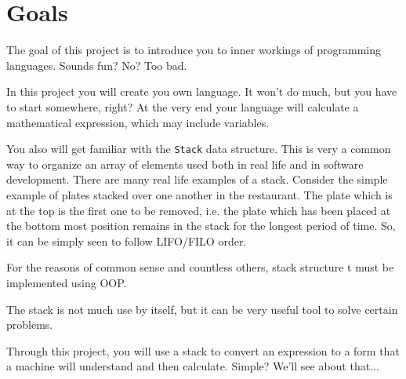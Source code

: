 \documentclass{42-en}
\begin{document}
\chapter{Goals}
    
    The goal of this project is to introduce you to inner workings of
    programming languages. Sounds fun? No? Too bad.
    
    In this project you will create you own language. It won't do much, but you
    have to start somewhere, right? At the very end your language will calculate
    a mathematical expression, which may include variables.
    
    You also will get familiar with the \texttt{Stack} data structure. 
    This is very a common way to organize an array of elements
    used both in real life and in software development. There are many real life
    examples of a stack. Consider the simple example of plates stacked over one 
    another in the restaurant. The plate which is at the top is the first one to be 
    removed, i.e. the plate which has been placed at the bottom most position 
    remains in the stack for the longest period of time. 
    So, it can be simply seen to follow LIFO/FILO order.
    
    
    For the reasons of common sense and countless others, stack structure t
    must be implemented using OOP.
    

    The stack is not much use by itself, but it can be very useful tool to solve certain
    problems.

    Through this project, you will use a stack to convert an expression to a form
    that a machine will understand and then calculate. Simple? We'll see about that...


\end{document}
